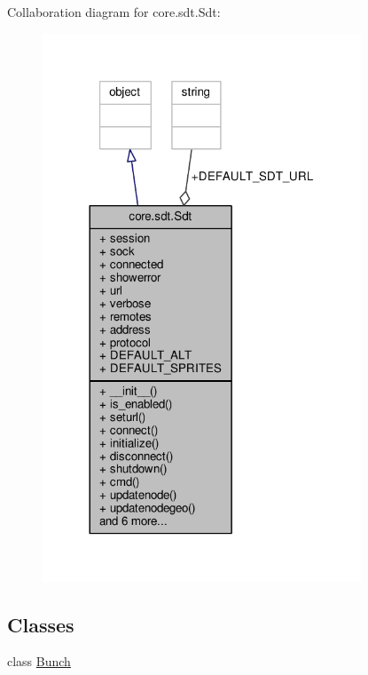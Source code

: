Collaboration diagram for core.\+sdt.\+Sdt\+:
\nopagebreak
\begin{figure}[H]
\begin{center}
\leavevmode
\includegraphics[width=269pt]{classcore_1_1sdt_1_1_sdt__coll__graph}
\end{center}
\end{figure}
\subsection*{Classes}
\begin{DoxyCompactItemize}
\item 
class \hyperlink{classcore_1_1sdt_1_1_sdt_1_1_bunch}{Bunch}
\end{DoxyCompactItemize}
